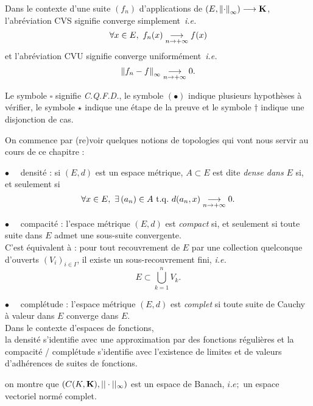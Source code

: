 \documentclass[a4paper,11pt, twoside]{article}
\begin{document}
Dans le contexte d'une suite $(f_n)$ d'applications de $\left(E,\left\lVert\cdot\right\rVert_\infty\right)\longrightarrow\mathbf K$, l'abréviation CVS signifie \og converge simplement\fg\ \emph{i.e.} 
$$\forall x\in E,\ f_n(x)\underset{n\to+\infty}{\longrightarrow} f(x)$$
et l'abréviation CVU signifie \og converge uniformément\fg\ \emph{i.e.}
$$\left\lVert f_n-f\right\rVert_\infty\underset{n\to+\infty}{\longrightarrow} 0.$$


Le symbole $\square$ signifie \emph{C.Q.F.D.}, le symbole $(\bullet)$ indique plusieurs hypothèses à vérifier, le symbole $\star$ indique une étape de la preuve et le symbole $\dagger$ indique une disjonction de cas.




\pagestyle{TestPage}



On commence par (re)voir quelques notions de topologies qui vont nous servir au cours de ce chapitre :



$\bullet\quad$ densité : si $(E,d)$ est un espace métrique, $A\subset E$ est dite \emph{dense dans }$E$ si, et seulement si 
$$\forall x\in E,\ \exists \left(a_n\right)\in A\ \mathrm{t.q.}\ d(a_n,x)\tend 0.$$

$\bullet\quad$ compacité : l'espace métrique $(E,d)$ est \emph{compact} si, et seulement si toute suite dans $E$ admet une sous-suite convergente.\\
C'est équivalent à : pour tout recouvrement de $E$ par une collection quelconque d'ouverts $\left(V_i\right)_{i\in I}$, il existe un sous-recouvrement fini, \emph{i.e.} 
$$E\subset\bigcup_{k=1}^nV_k.$$

$\bullet\quad$ complétude :  l'espace métrique $(E,d)$ est \emph{complet} si toute suite de Cauchy à valeur dans $E$ converge dans $E$.\\

Dans le contexte d'espaces de fonctions,\\
la densité s'identifie avec une approximation par des fonctions régulières et la compacité / complétude s'identifie avec l'existence de limites et de valeurs d'adhérences de suites de fonctions.\\


\setcounter{CompteurRemarque}{0}
\begin{RQ}
  on montre que $\left(C(K,\mathbf K),||\cdot||_{\infty}\right)$ est un espace de Banach, $i.e;$ un espace vectoriel normé complet.
\end{RQ} 
\end{document}
